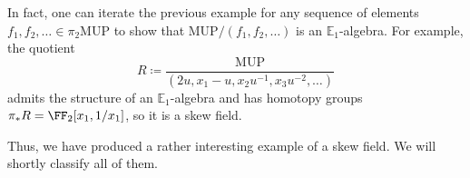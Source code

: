 \documentclass[../notes.tex]{subfiles}
\begin{document}
\begin{remark} \label{rem:quotient-by-pi2}
	In fact, one can iterate the previous example for any sequence of elements $f_1,f_2,\ldots\in\pi_2\mathrm{MUP}$ to show that $\mathrm{MUP}/(f_1,f_2,\ldots)$ is an $\mathbb E_1$-algebra. For example, the quotient
	\[R\coloneqq\frac{\mathrm{MUP}}{\left(2u,x_1-u,x_2u^{-1},x_3u^{-2},\ldots\right)}\]
	admits the structure of an $\mathbb E_1$-algebra and has homotopy groups $\pi_*R=\FF_2[x_1,1/x_1]$, so it is a skew field.
\end{remark}
Thus, we have produced a rather interesting example of a skew field. We will shortly classify all of them.
\end{document}
